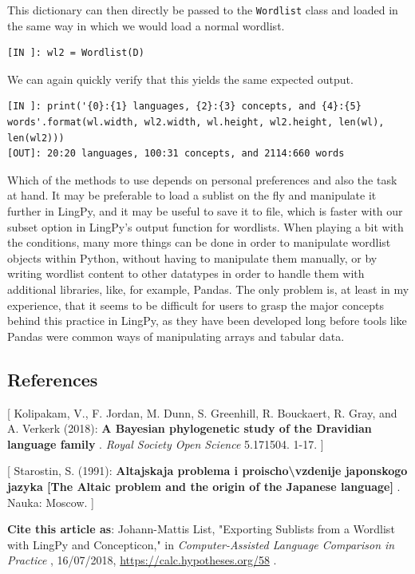 \documentclass[
  english,
  a4paper,
  oneside,tablecaptionabove
]{scrbook}
\newcommand{\passthrough}[1]{#1}
\begin{document}
This dictionary can then directly be passed to the
\passthrough{\lstinline!Wordlist!} class and loaded in the same way in
which we would load a normal wordlist.

\begin{lstlisting}
[IN ]: wl2 = Wordlist(D)
\end{lstlisting}

We can again quickly verify that this yields the same expected output.

\begin{lstlisting}
[IN ]: print('{0}:{1} languages, {2}:{3} concepts, and {4}:{5} words'.format(wl.width, wl2.width, wl.height, wl2.height, len(wl), len(wl2))) 
[OUT]: 20:20 languages, 100:31 concepts, and 2114:660 words
\end{lstlisting}

Which of the methods to use depends on personal preferences and also the
task at hand. It may be preferable to load a sublist on the fly and
manipulate it further in LingPy, and it may be useful to save it to
file, which is faster with our subset option in LingPy's output function
for wordlists. When playing a bit with the conditions, many more things
can be done in order to manipulate wordlist objects within Python,
without having to manipulate them manually, or by writing wordlist
content to other datatypes in order to handle them with additional
libraries, like, for example, Pandas. The only problem is, at least in
my experience, that it seems to be difficult for users to grasp the
major concepts behind this practice in LingPy, as they have been
developed long before tools like Pandas were common ways of manipulating
arrays and tabular data.

\hypertarget{references}{%
\subsection*{References}\label{references}}

{[} Kolipakam, V., F. Jordan, M. Dunn, S. Greenhill, R. Bouckaert, R.
Gray, and A. Verkerk (2018): \textbf{A Bayesian phylogenetic study of
the Dravidian language family} . \emph{Royal Society Open Science}
5.171504. 1-17. {]}

{[} Starostin, S. (1991): \textbf{Altajskaja problema i
proischo\textbackslash{}vzdenije japonskogo jazyka {[}The Altaic problem
and the origin of the Japanese language{]}} . Nauka: Moscow. {]}

\textbf{Cite this article as}: Johann-Mattis List, "Exporting Sublists
from a Wordlist with LingPy and Concepticon," in \emph{Computer-Assisted
Language Comparison in Practice} , 16/07/2018,
\url{https://calc.hypotheses.org/58} .
\end{document}

